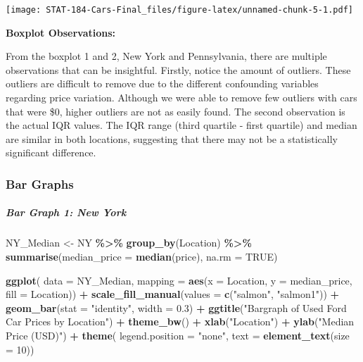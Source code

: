 \documentclass[
]{article}
\newenvironment{Shaded}{\begin{snugshade}}{\end{snugshade}}
\newcommand{\AttributeTok}[1]{\textcolor[rgb]{0.13,0.29,0.53}{#1}}
\newcommand{\ConstantTok}[1]{\textcolor[rgb]{0.56,0.35,0.01}{#1}}
\newcommand{\DecValTok}[1]{\textcolor[rgb]{0.00,0.00,0.81}{#1}}
\newcommand{\FloatTok}[1]{\textcolor[rgb]{0.00,0.00,0.81}{#1}}
\newcommand{\FunctionTok}[1]{\textcolor[rgb]{0.13,0.29,0.53}{\textbf{#1}}}
\newcommand{\NormalTok}[1]{#1}
\newcommand{\OtherTok}[1]{\textcolor[rgb]{0.56,0.35,0.01}{#1}}
\newcommand{\SpecialCharTok}[1]{\textcolor[rgb]{0.81,0.36,0.00}{\textbf{#1}}}
\newcommand{\StringTok}[1]{\textcolor[rgb]{0.31,0.60,0.02}{#1}}
\begin{document}
\texttt{[image: STAT-184-Cars-Final\_files/figure-latex/unnamed-chunk-5-1.pdf]}

\textbf{Boxplot Observations:}

From the boxplot 1 and 2, New York and Pennsylvania, there are multiple
observations that can be insightful. Firstly, notice the amount of
outliers. These outliers are difficult to remove due to the different
confounding variables regarding price variation. Although we were able
to remove few outliers with cars that were \$0, higher outliers are not
as easily found. The second observation is the actual IQR values. The
IQR range (third quartile - first quartile) and median are similar in
both locations, suggesting that there may not be a statistically
significant difference.

\hypertarget{bar-graphs}{%
\subsubsection{\texorpdfstring{\textbf{Bar
Graphs}}{Bar Graphs}}\label{bar-graphs}}

\hypertarget{bar-graph-1-new-york}{%
\subparagraph{Bar Graph 1: New York}\label{bar-graph-1-new-york}}

\begin{Shaded}
\begin{Highlighting}[]
\NormalTok{NY\_Median }\OtherTok{\textless{}{-}}\NormalTok{ NY }\SpecialCharTok{\%\textgreater{}\%}
  \FunctionTok{group\_by}\NormalTok{(Location) }\SpecialCharTok{\%\textgreater{}\%}
  \FunctionTok{summarise}\NormalTok{(}\AttributeTok{median\_price =} \FunctionTok{median}\NormalTok{(price), }\AttributeTok{na.rm =} \ConstantTok{TRUE}\NormalTok{)}

\FunctionTok{ggplot}\NormalTok{(}
\AttributeTok{data =}\NormalTok{ NY\_Median,}
\AttributeTok{mapping =} \FunctionTok{aes}\NormalTok{(}\AttributeTok{x =}\NormalTok{ Location, }\AttributeTok{y =}\NormalTok{ median\_price, }\AttributeTok{fill =}\NormalTok{ Location)) }\SpecialCharTok{+}
  \FunctionTok{scale\_fill\_manual}\NormalTok{(}\AttributeTok{values =} \FunctionTok{c}\NormalTok{(}\StringTok{"salmon"}\NormalTok{, }\StringTok{"salmon1"}\NormalTok{)) }\SpecialCharTok{+}
  \FunctionTok{geom\_bar}\NormalTok{(}\AttributeTok{stat =} \StringTok{"identity"}\NormalTok{, }\AttributeTok{width =} \FloatTok{0.3}\NormalTok{) }\SpecialCharTok{+}
  \FunctionTok{ggtitle}\NormalTok{(}\StringTok{"Bargraph of Used Ford Car Prices by Location"}\NormalTok{) }\SpecialCharTok{+}
  \FunctionTok{theme\_bw}\NormalTok{() }\SpecialCharTok{+}
  \FunctionTok{xlab}\NormalTok{(}\StringTok{"Location"}\NormalTok{) }\SpecialCharTok{+}
  \FunctionTok{ylab}\NormalTok{(}\StringTok{"Median Price (USD)"}\NormalTok{) }\SpecialCharTok{+}
  \FunctionTok{theme}\NormalTok{(}
  \AttributeTok{legend.position =} \StringTok{"none"}\NormalTok{,}
  \AttributeTok{text =} \FunctionTok{element\_text}\NormalTok{(}\AttributeTok{size =} \DecValTok{10}\NormalTok{))}
\end{Highlighting}
\end{Shaded}
\end{document}
